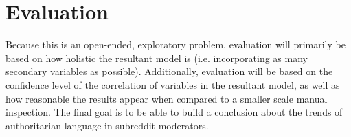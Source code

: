 \documentclass[letterpaper,twocolumn,10pt]{article}
\begin{document}
\section{Evaluation}

Because this is an open-ended, exploratory problem, evaluation will primarily be based on how holistic the resultant model is (i.e. incorporating as many secondary variables as possible). Additionally, evaluation will be based on the confidence level of the correlation of variables in the resultant model, as well as how reasonable the results appear when compared to a smaller scale manual inspection. The final goal is to be able to build a conclusion about the trends of authoritarian language in subreddit moderators.




\end{document}
